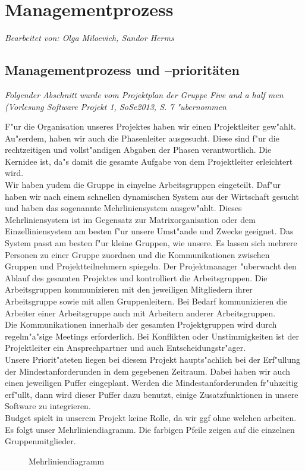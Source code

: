 \section{Managementprozess}

\textit{Bearbeitet von: Olga Miloevich, Sandor Herms}\\

\subsection{Managementprozess und --prioritäten}

\textit{Folgender Abschnitt wurde vom Projektplan der Gruppe Five and a half men (Vorlesung Software Projekt 1, SoSe2013, S. 7 "ubernommen}

F"ur die Organisation unseres Projektes haben wir einen Projektleiter gew"ahlt. Au"serdem, haben wir auch die Phasenleiter ausgesucht. Diese sind f"ur die rechtzeitigen und vollst"andigen Abgaben der Phasen verantwortlich. Die Kernidee ist, da"s damit die gesamte Aufgabe von dem Projektleiter erleichtert wird. \\
Wir haben yudem die Gruppe in einyelne Arbeitsgruppen eingeteilt. Daf"ur haben wir nach einem schnellen dynamischen System aus der Wirtschaft gesucht und haben das sogenannte Mehrliniensystem ausgew"ahlt. Dieses Mehrliniensystem ist im Gegensatz zur Matrixorganisation oder dem Einzelliniensystem am besten f"ur unsere Umst"ande und Zwecke geeignet. Das System passt am besten f"ur kleine Gruppen, wie unsere. Es lassen sich mehrere Personen zu einer Gruppe zuordnen und die Kommunikationen zwischen Gruppen und Projektteilnehmern spiegeln. \newline
Der Projektmanager "uberwacht den Ablauf des gesamten Projektes und kontrolliert die Arbeitsgruppen. Die Arbeitsgruppen kommunizieren mit den jeweiligen Mitgliedern ihrer Arbeitsgruppe sowie mit allen Gruppenleitern. Bei Bedarf kommunizieren die Arbeiter einer Arbeitsgruppe auch mit Arbeitern anderer Arbeitsgruppen. \\
Die Kommunikationen innerhalb der gesamten Projektgruppen wird durch regelm"a"sige Meetings erforderlich. Bei Konflikten oder Unstimmigkeiten ist der Projektleiter ein Ansprechpartner und auch Entscheidungstr"ager.\\
Unsere Priorit"ateten liegen bei diesem Projekt haupts"achlich bei der Erf"ullung der Mindestanforderunden in dem gegebenen Zeitraum. Dabei haben wir auch einen jeweiligen Puffer eingeplant. Werden die Mindestanforderunden fr"uhzeitig erf"ullt, dann wird dieser Puffer dazu benutzt, einige Zusatzfunktionen in unsere Software zu integrieren. \\
Budget spielt in unserem Projekt keine Rolle, da wir ggf ohne welchen arbeiten. 
Es folgt unser Mehrliniendiagramm. Die farbigen Pfeile zeigen auf die einzelnen Gruppenmitglieder.\\
\begin{figure}[H]
\caption{Mehrliniendiagramm}
\label{Bild:image}
\end{figure}

